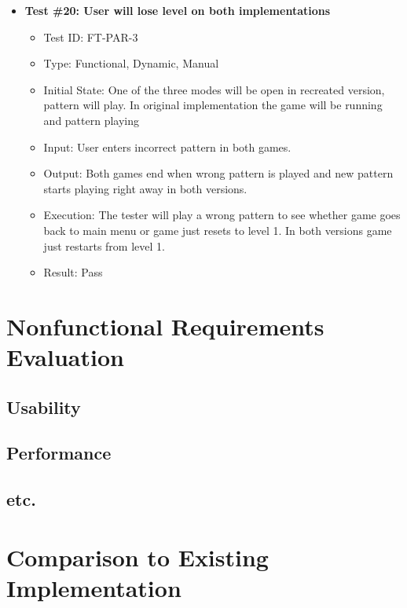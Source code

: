 \documentclass[12pt, titlepage]{article}
\begin{document}
\begin{itemize}
\item \textbf{Test \#20: User will lose level on both implementations }
\begin{itemize}
\item Test ID: FT-PAR-3
\item Type: Functional, Dynamic, Manual 		
\item Initial State: One of the three modes will be open in recreated version, pattern will play. In original implementation the game will be running and pattern playing				
\item Input: User enters incorrect pattern in both games.
\item Output: Both games end when wrong pattern is played and new pattern starts playing right away in both versions.			
\item Execution: The tester will play a wrong pattern to see whether game goes back to main menu or game just resets to level 1. In both versions game just restarts from level 1.
\item Result: Pass
\end{itemize}

\end{itemize}

\section{Nonfunctional Requirements Evaluation}

\subsection{Usability}
		
\subsection{Performance}

\subsection{etc.}
	
\section{Comparison to Existing Implementation}	
\end{document}
